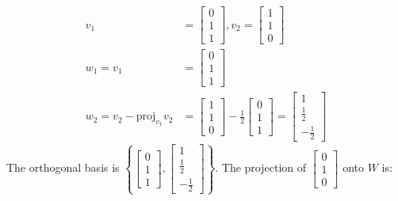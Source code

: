 \documentclass{article}
\begin{document}
\begin{equation}
    \begin{split}
        v_1 & = \begin{bmatrix}0 \\ 1 \\ 1\end{bmatrix}, v_2 = \begin{bmatrix}1 \\ 1 \\ 0\end{bmatrix} \\
        w_1 = v_1 & = \begin{bmatrix}0 \\ 1 \\ 1\end{bmatrix} \\
        w_2 = v_2 - \mathrm{proj}_{v_1} v_2 & = \begin{bmatrix}1 \\ 1 \\ 0\end{bmatrix} - \frac{1}{2}\begin{bmatrix}0 \\ 1 \\ 1\end{bmatrix} = \begin{bmatrix}1 \\ \frac{1}{2} \\ -\frac{1}{2}\end{bmatrix}
    \end{split}
\end{equation}
The orthogonal basis is $\left\{\begin{bmatrix}0 \\ 1 \\ 1\end{bmatrix}, \begin{bmatrix}1 \\ \frac{1}{2} \\ -\frac{1}{2}\end{bmatrix}\right\}$. The projection of $\begin{bmatrix} 0 \\ 1 \\ 0 \end{bmatrix}$ onto $W$ is:
\end{document}
